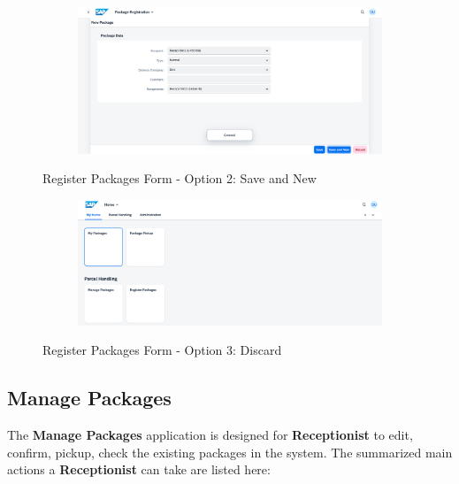 \begin{figure}[H]
	\centering
    \begin{subfigure}{1\linewidth}
        \centering
        \includegraphics[width=1\linewidth]{images/user_doc/registration/saveAndNewToast.png}
    \end{subfigure}
    \caption{Register Packages Form - Option 2: Save and New}
    \label{fig:RPsaveNewOp}
\end{figure}

\begin{figure}[H]
	\centering
    \begin{subfigure}{1\linewidth}
        \centering
        \includegraphics[width=1\linewidth]{images/user_doc/registration/discardTarget.png}
    \end{subfigure}
    \caption{Register Packages Form - Option 3: Discard}
    \label{fig:RPdiscardOp}
\end{figure}

\subsection{Manage Packages}                     

The \textbf{Manage Packages} application is designed for \textbf{Receptionist} to edit, confirm, pickup, check the existing packages in the system. The summarized main actions a \textbf{Receptionist} can take are listed here:

